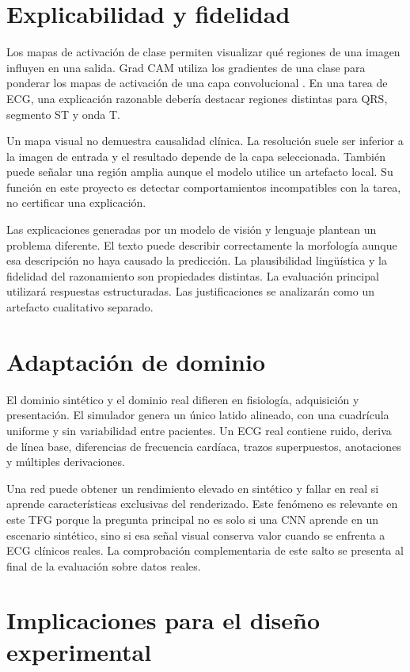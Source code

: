 \section{Explicabilidad y fidelidad}

Los mapas de activación de clase permiten visualizar qué regiones de una imagen influyen en una salida. Grad CAM utiliza los gradientes de una clase para ponderar los mapas de activación de una capa convolucional \cite{selvaraju2017}. En una tarea de ECG, una explicación razonable debería destacar regiones distintas para QRS, segmento ST y onda T.

Un mapa visual no demuestra causalidad clínica. La resolución suele ser inferior a la imagen de entrada y el resultado depende de la capa seleccionada. También puede señalar una región amplia aunque el modelo utilice un artefacto local. Su función en este proyecto es detectar comportamientos incompatibles con la tarea, no certificar una explicación.

Las explicaciones generadas por un modelo de visión y lenguaje plantean un problema diferente. El texto puede describir correctamente la morfología aunque esa descripción no haya causado la predicción. La plausibilidad lingüística y la fidelidad del razonamiento son propiedades distintas. La evaluación principal utilizará respuestas estructuradas. Las justificaciones se analizarán como un artefacto cualitativo separado.

\section{Adaptación de dominio}

El dominio sintético y el dominio real difieren en fisiología, adquisición y presentación. El simulador genera un único latido alineado, con una cuadrícula uniforme y sin variabilidad entre pacientes. Un ECG real contiene ruido, deriva de línea base, diferencias de frecuencia cardíaca, trazos superpuestos, anotaciones y múltiples derivaciones.

Una red puede obtener un rendimiento elevado en sintético y fallar en real si aprende características exclusivas del renderizado. Este fenómeno es relevante en este TFG porque la pregunta principal no es solo si una CNN aprende en un escenario sintético, sino si esa señal visual conserva valor cuando se enfrenta a ECG clínicos reales. La comprobación complementaria de este salto se presenta al final de la evaluación sobre datos reales.

\section{Implicaciones para el diseño experimental}

